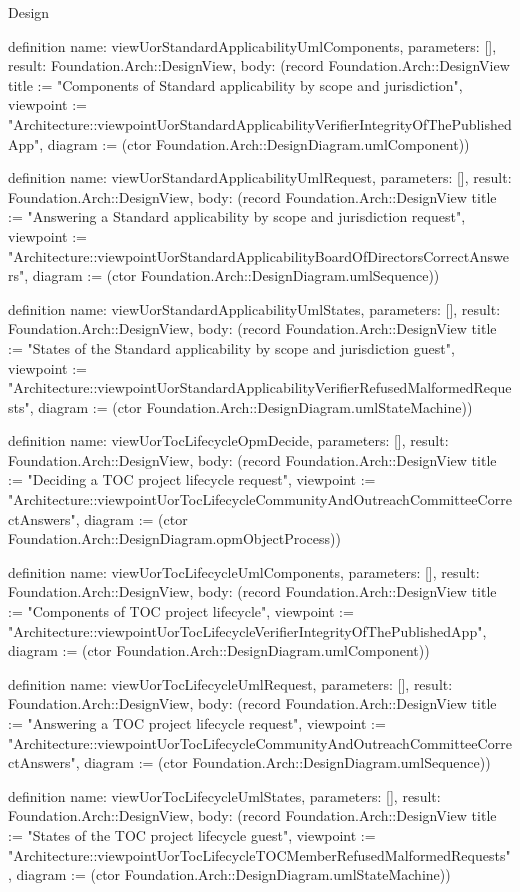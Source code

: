 \begin{lexlean}{Design}
\begin{semanticmodule}
definition{
  name: viewUorStandardApplicabilityUmlComponents,
  parameters: [],
  result: Foundation.Arch::DesignView,
  body: (record Foundation.Arch::DesignView {title := "Components of Standard applicability by scope and jurisdiction", viewpoint := "Architecture::viewpointUorStandardApplicabilityVerifierIntegrityOfThePublishedApp", diagram := (ctor Foundation.Arch::DesignDiagram.umlComponent)})
}

definition{
  name: viewUorStandardApplicabilityUmlRequest,
  parameters: [],
  result: Foundation.Arch::DesignView,
  body: (record Foundation.Arch::DesignView {title := "Answering a Standard applicability by scope and jurisdiction request", viewpoint := "Architecture::viewpointUorStandardApplicabilityBoardOfDirectorsCorrectAnswers", diagram := (ctor Foundation.Arch::DesignDiagram.umlSequence)})
}

definition{
  name: viewUorStandardApplicabilityUmlStates,
  parameters: [],
  result: Foundation.Arch::DesignView,
  body: (record Foundation.Arch::DesignView {title := "States of the Standard applicability by scope and jurisdiction guest", viewpoint := "Architecture::viewpointUorStandardApplicabilityVerifierRefusedMalformedRequests", diagram := (ctor Foundation.Arch::DesignDiagram.umlStateMachine)})
}

definition{
  name: viewUorTocLifecycleOpmDecide,
  parameters: [],
  result: Foundation.Arch::DesignView,
  body: (record Foundation.Arch::DesignView {title := "Deciding a TOC project lifecycle request", viewpoint := "Architecture::viewpointUorTocLifecycleCommunityAndOutreachCommitteeCorrectAnswers", diagram := (ctor Foundation.Arch::DesignDiagram.opmObjectProcess)})
}

definition{
  name: viewUorTocLifecycleUmlComponents,
  parameters: [],
  result: Foundation.Arch::DesignView,
  body: (record Foundation.Arch::DesignView {title := "Components of TOC project lifecycle", viewpoint := "Architecture::viewpointUorTocLifecycleVerifierIntegrityOfThePublishedApp", diagram := (ctor Foundation.Arch::DesignDiagram.umlComponent)})
}

definition{
  name: viewUorTocLifecycleUmlRequest,
  parameters: [],
  result: Foundation.Arch::DesignView,
  body: (record Foundation.Arch::DesignView {title := "Answering a TOC project lifecycle request", viewpoint := "Architecture::viewpointUorTocLifecycleCommunityAndOutreachCommitteeCorrectAnswers", diagram := (ctor Foundation.Arch::DesignDiagram.umlSequence)})
}

definition{
  name: viewUorTocLifecycleUmlStates,
  parameters: [],
  result: Foundation.Arch::DesignView,
  body: (record Foundation.Arch::DesignView {title := "States of the TOC project lifecycle guest", viewpoint := "Architecture::viewpointUorTocLifecycleTOCMemberRefusedMalformedRequests", diagram := (ctor Foundation.Arch::DesignDiagram.umlStateMachine)})
}


\end{semanticmodule}
\end{lexlean}
